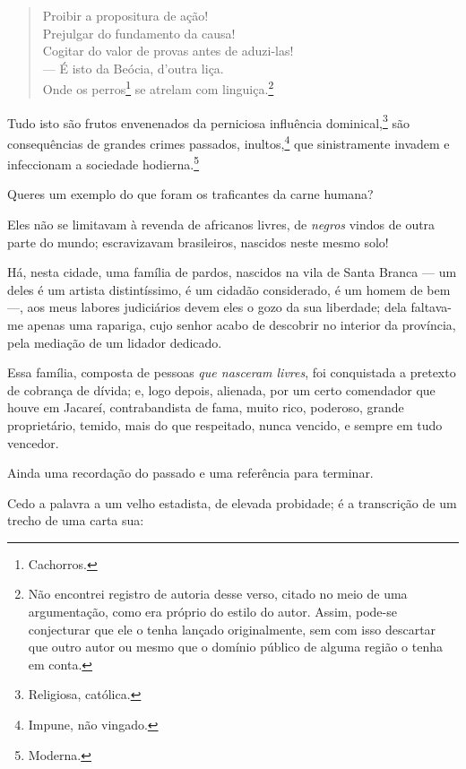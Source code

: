 \begin{verse}
Proibir a propositura de ação!\\
Prejulgar do fundamento da causa!\\
Cogitar do valor de provas antes de aduzi-las!\\
--- É isto da Beócia, d'outra liça.\\
Onde os perros\footnote{Cachorros.} se atrelam com linguiça.\footnote{
  Não encontrei registro de autoria desse verso, citado no meio de uma
  argumentação, como era próprio do estilo do autor. Assim, pode-se
  conjecturar que ele o tenha lançado originalmente, sem com isso
  descartar que outro autor ou mesmo que o domínio público de alguma
  região o tenha em conta.}
\end{verse}  

Tudo isto são frutos envenenados da perniciosa influência
dominical,\footnote{Religiosa, católica.} são consequências de grandes
crimes passados, inultos,\footnote{Impune, não vingado.} que
sinistramente invadem e infeccionam a sociedade hodierna.\footnote{
  Moderna.}

Queres um exemplo do que foram os traficantes da carne humana?

Eles não se limitavam à revenda de africanos livres, de \emph{negros}
vindos de outra parte do mundo; escravizavam brasileiros, nascidos neste
mesmo solo!

Há, nesta cidade, uma família de pardos, nascidos na vila de Santa
Branca --- um deles é um artista distintíssimo, é um cidadão
considerado, é um homem de bem ---, aos meus labores judiciários devem
eles o gozo da sua liberdade; dela faltava-me apenas uma rapariga, cujo
senhor acabo de descobrir no interior da província, pela mediação de um
lidador dedicado.

Essa família, composta de pessoas \textit{que nasceram livres}, foi conquistada a
pretexto de cobrança de dívida; e, logo depois, alienada, por um certo
comendador que houve em Jacareí, contrabandista de fama, muito rico,
poderoso, grande proprietário, temido, mais do que respeitado, nunca
vencido, e sempre em tudo vencedor.

Ainda uma recordação do passado e uma referência para terminar.

Cedo a palavra a um velho estadista, de elevada probidade; é a
transcrição de um trecho de uma carta sua:

